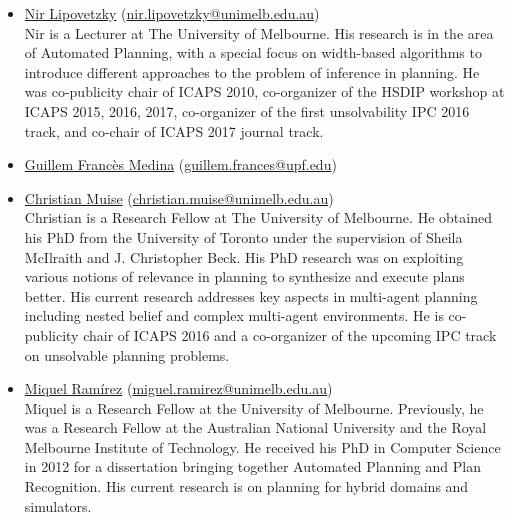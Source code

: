 \documentclass[10pt]{article}
\begin{document}
\begin{itemize}
\item \href{http://people.eng.unimelb.edu.au/nlipovetzky/}{Nir Lipovetzky}
  (\href{mailto:nir.lipovetzky@unimelb.edu.au}{nir.lipovetzky@unimelb.edu.au})\\
Nir is a Lecturer at The University of Melbourne. 
His research is in the area of Automated Planning, with a special focus on width-based algorithms
to introduce different approaches to the problem of inference in planning. He was co-publicity chair of ICAPS 2010, co-organizer
of the HSDIP workshop at ICAPS 2015, 2016, 2017, co-organizer of the first unsolvability IPC 2016 track, and co-chair of ICAPS 2017 journal track.

\item \href{http://}{Guillem Francès Medina}
  (\href{mailto:guillem.frances@upf.edu}{guillem.frances@upf.edu})\\


\item \href{http://www.haz.ca/}{Christian Muise}
 (\href{mailto:christian.muise@unimelb.edu.au}{christian.muise@unimelb.edu.au})\\
Christian is a Research Fellow at The University of Melbourne. He obtained his PhD
from the University of Toronto under the supervision of Sheila McIlraith and J.
Christopher Beck. His PhD research was on exploiting various notions of relevance
in planning to synthesize and execute plans better. His current research addresses
key aspects in multi-agent planning including nested belief and complex multi-agent
environments. He is co-publicity chair of ICAPS 2016 and a co-organizer of the upcoming
IPC track on unsolvable planning problems.

%
\item \href{http://findanexpert.unimelb.edu.au/display/person778610#tab-overview}{Miquel Ram\'{i}rez}
  (\href{mailto:miguel.ramirez@unimelb.edu.au}{miguel.ramirez@unimelb.edu.au})\\
Miquel is a Research Fellow at the University of Melbourne. Previously, he was
a Research Fellow at the Australian National University and the Royal Melbourne
Institute of Technology. He
received his PhD in Computer Science in 2012 for a dissertation
bringing together Automated Planning and Plan Recognition. His current
research is on planning for hybrid domains and simulators.



\end{itemize}
\end{document}
